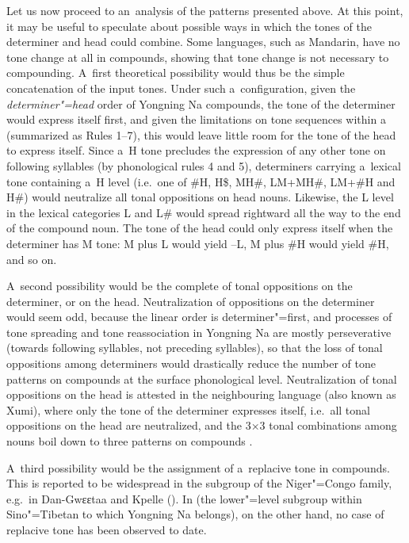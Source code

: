 Let us now proceed to an~analysis of the patterns presented above. At this point, it may be useful to speculate about possible ways in which the tones of the determiner and head could combine. Some languages, such as {Mandarin}, have no tone change at all in compounds, showing that tone change is not necessary to compounding. A~first theoretical possibility would thus be the simple concatenation of the input tones. Under such a~configuration, given the \textit{determiner"=head} order of Yongning Na compounds, the tone of the determiner would express
itself first, and given the limitations on tone sequences within a~ (summarized as Rules
1--7), this would leave little room for the tone of the head to express itself. Since a~H
tone precludes the expression of any other
tone on following syllables (by phonological rules 4 and 5), determiners carrying a~lexical tone containing a~H level (i.e.\ one of \#H, H\$, MH\#, LM+MH\#, LM+\#H and H\#) would neutralize all tonal oppositions on head nouns. Likewise, the L level in the lexical categories L and L\# would spread
rightward all the way to the end of the compound noun. The tone of the head could only
express itself when the determiner has M tone: M plus L would yield --L, M plus \#H would yield \#H, and so on.

A~second possibility would be the complete  of tonal oppositions on the determiner, or on the head. Neutralization of oppositions on the determiner would seem odd, because the linear order is determiner"=first, and processes of tone spreading and tone reassociation in Yongning Na are mostly perseverative (towards following syllables, not preceding syllables), so that the loss of tonal oppositions among determiners would drastically reduce the number of tone patterns on compounds at the surface phonological level. Neutralization of tonal oppositions on the head is attested in the neighbouring language  (also known as Xumi), where only the tone of the determiner expresses
itself, i.e.\ all tonal oppositions on the head are neutralized, and the 3×3 tonal combinations among nouns boil down to three patterns on compounds \citep{chirkovaetal2009}. %

A~third possibility would be the assignment of a~replacive tone in compounds. This is reported to be widespread in the  subgroup of the Niger"=Congo family, e.g.~in Dan-Gwɛɛtaa \citep{vydrin2016} and Kpelle (\cites{welmers1969}[132]{welmers1973}[239]{konoshenko2014syntax}). In  (the lower"=level subgroup within Sino"=Tibetan to which Yongning Na belongs), on the other hand, no case of replacive tone has been observed to date.

